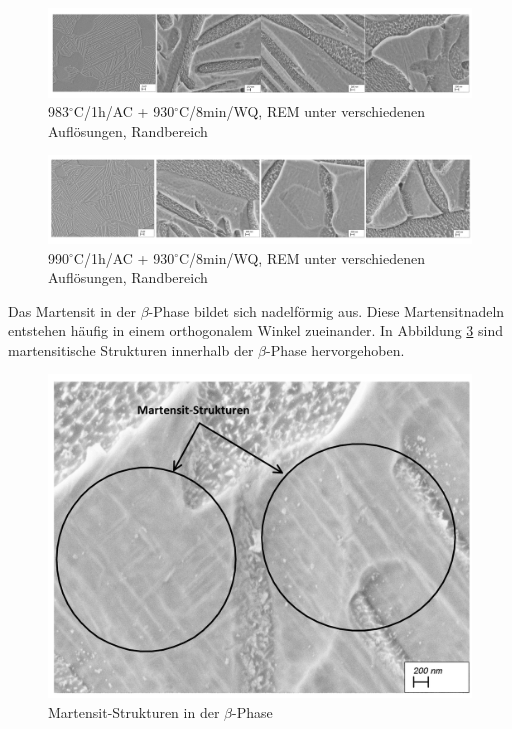 \pagebreak

\begin{figure}[!]
	\centering
	\includegraphics[width=0.9\linewidth]{./Bilder/Abbildung 12}
	\caption[Abbildung 12]{983$^\circ$C/1h/AC + 930$^\circ$C/8min/WQ, REM unter verschiedenen Auflösungen, Randbereich}
	\label{fig:abbildung-12}
\end{figure}

\begin{figure}[!]
	\centering
	\includegraphics[width=0.9\linewidth]{./Bilder/Abbildung 13}
	\caption[Abbildung 13]{990$^\circ$C/1h/AC + 930$^\circ$C/8min/WQ, REM unter verschiedenen Auflösungen, Randbereich}
	\label{fig:abbildung-13}
\end{figure}

Das Martensit in der $\beta$-Phase bildet sich nadelförmig aus. Diese Martensitnadeln entstehen häufig in einem orthogonalem Winkel zueinander. In Abbildung \ref{fig:abbildung-21} sind martensitische Strukturen innerhalb der $\beta$-Phase hervorgehoben.

\begin{figure}[!]
	\centering
	\includegraphics[width=0.8\linewidth]{./Bilder/Abbildung 21}
	\caption[Abbildung]{Martensit-Strukturen in der $\beta$-Phase}
	\label{fig:abbildung-21}
\end{figure}

